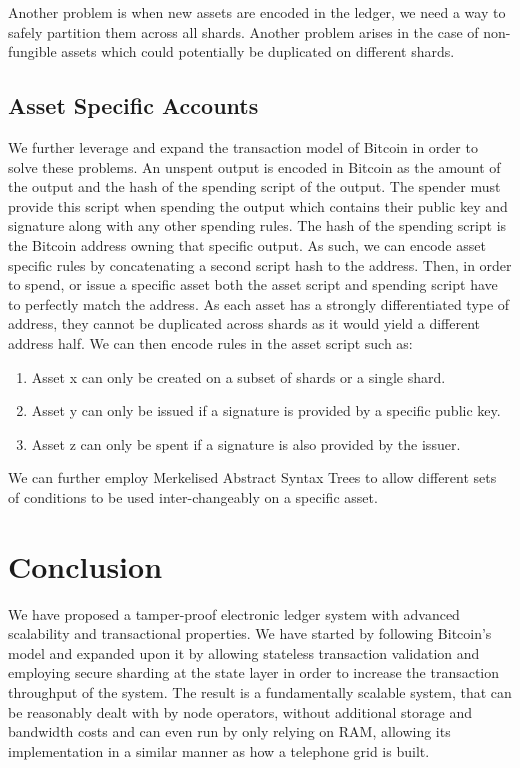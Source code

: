 \documentclass[notitlepage]{article}
\begin{document}
Another problem is when new assets are encoded in the ledger, we need a way to safely partition them across all shards. Another problem arises in the case of non-fungible assets which could potentially be duplicated on different shards. 

\subsection{Asset Specific Accounts}
We further leverage and expand the transaction model of Bitcoin in order to solve these problems. An unspent output is encoded in Bitcoin as the amount of the output and the hash of the spending script of the output. The spender must provide this script when spending the output which contains their public key and signature along with any other spending rules. The hash of the spending script is the Bitcoin address owning that specific output. As such, we can encode asset specific rules by concatenating a second script hash to the address. Then, in order to spend, or issue a specific asset both the asset script and spending script have to perfectly match the address. As each asset has a strongly differentiated type of address, they cannot be duplicated across shards as it would yield a different address half. We can then encode rules in the asset script such as:
\begin{enumerate}
  \item Asset x can only be created on a subset of shards or a single shard.
  \item Asset y can only be issued if a signature is provided by a specific public key.
  \item Asset z can only be spent if a signature is also provided by the issuer. 
\end{enumerate}

We can further employ Merkelised Abstract Syntax Trees \cite{mast} to allow different sets of conditions to be used inter-changeably on a specific asset.

\clearpage

\section{Conclusion}
We have proposed a tamper-proof electronic ledger system with advanced scalability and transactional properties. We have started by following Bitcoin's model and expanded upon it by allowing stateless transaction validation and employing secure sharding at the state layer in order to increase the transaction throughput of the system. The result is a fundamentally scalable system, that can be reasonably dealt with by node operators, without additional storage and bandwidth costs and can even run by only relying on RAM, allowing its implementation in a similar manner as how a telephone grid is built. 
\end{document}
